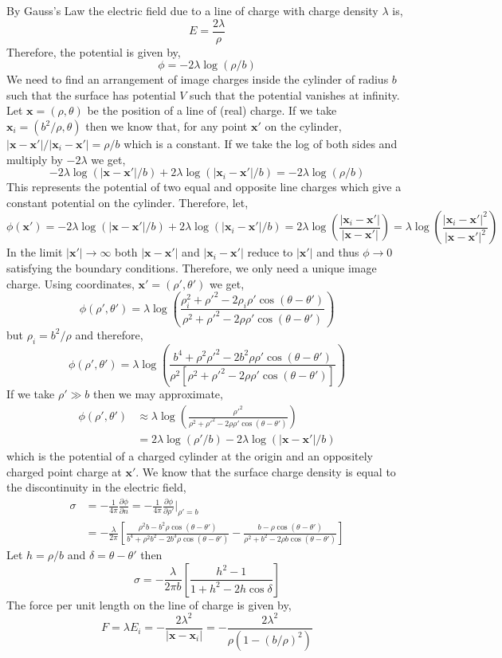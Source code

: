 \documentclass[12pt]{extarticle}
\newcommand{\pderiv}[2]{\frac{\partial{#1}}{\partial{#2}}}
\theoremstyle{definition}
\newcommand{\x}{\mathbf{x}}
\begin{document}
By Gauss's Law the electric field due to a line of charge with charge density $\lambda$ is,
\[ E = \frac{2 \lambda}{\rho} \]
Therefore, the potential is given by,
\[ \phi = - 2 \lambda \log{(\rho / b)} \]
We need to find an arrangement of image charges inside the cylinder of radius $b$ such that the surface has potential $V$ such that the potential vanishes at infinity. Let $\x = (\rho, \theta)$ be the position of a line of (real) charge. If we take $\x_i = (b^2 / \rho, \theta)$ then we know that, for any point $\x'$ on the cylinder, $|\x - \x'| / |\x_i - \x'| = \rho / b$ which is a constant. If we take the log of both sides and multiply by $-2 \lambda$ we get,
\[ -2 \lambda \log{(|\x - \x'|/b)} + 2 \lambda \log{(|\x_i - \x'|/b)} = -2 \lambda \log{(\rho / b)} \] 
This represents the potential of two equal and opposite line charges which give a constant potential on the cylinder. Therefore, let,
\[ \phi(\x') = - 2 \lambda \log{(|\x - \x'|/b)} + 2 \lambda \log{(|\x_i - \x'|/b)} = 2 \lambda \log{\left( \frac{|\x_i - \x'|}{|\x - \x'|} \right)} = \lambda \log{\left( \frac{|\x_i - \x'|^2}{|\x - \x'|^2} \right)} \]
In the limit $|\x'| \to \infty$ both $|\x - \x'|$ and $|\x_i - \x'|$ reduce to $|\x'|$ and thus $\phi \to 0$ satisfying the boundary conditions. Therefore, we only need a unique image charge. Using coordinates, $\x' = (\rho', \theta')$ we get,
\[ 
\phi(\rho', \theta') = \lambda \log{\left( \frac{\rho_i^2 + \rho'^2 - 2 \rho_i \rho' \cos{(\theta - \theta')}}{\rho^2 + \rho'^2 - 2 \rho \rho' \cos{(\theta - \theta')}} \right)}
\]
but $\rho_i = b^2 / \rho$ and therefore,
\[
\phi(\rho', \theta') = \lambda \log{\left( \frac{b^4 + \rho^2 \rho'^2 - 2 b^2 \rho \rho' \cos{(\theta - \theta')}}{\rho^2 \left[ \rho^2 + \rho'^2 - 2 \rho \rho' \cos{(\theta - \theta')} \right]} \right)}
\]
If we take $\rho' \gg b$ then we may approximate,
\begin{align*}
\phi(\rho', \theta') & \approx \lambda \log{\left( \frac{\rho'^2}{\rho^2 + \rho'^2 - 2 \rho \rho' \cos{(\theta - \theta')} } \right)}
\\
& = 2 \lambda \log{\left( \rho' / b \right)} - 2 \lambda \log{(|\x - \x'| / b)}
\end{align*}
which is the potential of a charged cylinder at the origin and an oppositely charged point charge at $\x'$. We know that the surface charge density is equal to the discontinuity in the electric field,
\begin{align*}
\sigma & = - \frac{1}{4 \pi} \pderiv{\phi}{n} = - \frac{1}{4 \pi} \pderiv{\phi}{\rho'} \bigg|_{\rho' = b}
\\
& = - \frac{\lambda}{2 \pi} \left[ \frac{\rho^2 b - b^2 \rho \cos{(\theta - \theta')}}{b^4 + \rho^2 b^2 - 2 b^3 \rho \cos{(\theta - \theta')}} - \frac{b - \rho \cos{(\theta - \theta')} }{ \rho^2 + b^2 - 2 \rho b \cos{(\theta - \theta')} }  \right]
\end{align*} 
Let $h = \rho / b$ and $\delta = \theta - \theta'$ then
\[ \sigma = - \frac{\lambda}{2 \pi b} \left[ \frac{h^2 - 1}{1 + h^2 - 2h \cos{\delta}}  \right] \]
The force per unit length on the line of charge is given by,
\[ F = \lambda E_{i} = - \frac{2\lambda^2}{|\x - \x_i|} = - \frac{2 \lambda^2}{\rho \left(1 - (b/\rho)^2 \right)} \]
\end{document}
